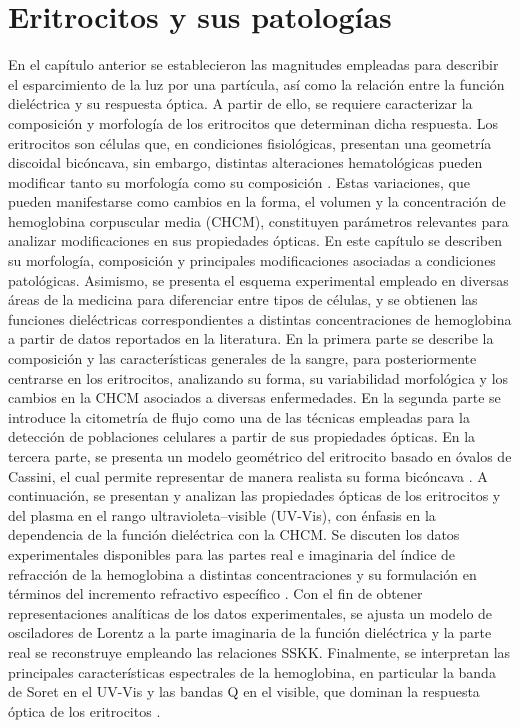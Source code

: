 
\chapter{Eritrocitos y sus patologías}
\label{chapter:eritrocitos}


En el capítulo anterior se establecieron las magnitudes empleadas para describir el esparcimiento de la luz por una partícula, así como la relación entre la función dieléctrica y su respuesta óptica. A partir de ello, se requiere caracterizar la composición y morfología de los eritrocitos que determinan dicha respuesta. Los eritrocitos son células que, en condiciones fisiológicas, presentan una geometría discoidal bicóncava, sin embargo, distintas alteraciones hematológicas pueden modificar tanto su morfología como su composición \cite{palTextbookMedicalPhysiology2021}. Estas variaciones, que pueden manifestarse como cambios en la forma, el volumen y la concentración de hemoglobina corpuscular media (CHCM), constituyen parámetros relevantes para analizar modificaciones en sus propiedades ópticas. En este capítulo se describen su morfología, composición y principales modificaciones asociadas a condiciones patológicas. Asimismo, se presenta el esquema experimental empleado en diversas áreas de la medicina para diferenciar entre tipos de células, y se obtienen las funciones dieléctricas correspondientes a distintas concentraciones de hemoglobina a partir de datos reportados en la literatura. En la primera parte se describe la composición y las características generales de la sangre, para posteriormente centrarse en los eritrocitos, analizando su forma, su variabilidad morfológica y los cambios en la CHCM asociados a diversas enfermedades. En la segunda parte se introduce la citometría de flujo como una de las técnicas empleadas para la detección de poblaciones celulares a partir de sus propiedades ópticas. En la tercera parte, se presenta un modelo geométrico del eritrocito basado en óvalos de Cassini, el cual permite representar de manera realista su forma bicóncava \cite{ereminaDifferentShapeModels2006}. A continuación, se presentan y analizan las propiedades ópticas de los eritrocitos y del plasma en el rango ultravioleta–visible (UV-Vis), con énfasis en la dependencia de la función dieléctrica con la CHCM. Se discuten los datos experimentales disponibles para las partes real e imaginaria del índice de refracción de la hemoglobina a distintas concentraciones y su formulación en términos del incremento refractivo específico \cite{friebelModelFunctionCalculate2006}. Con el fin de obtener representaciones analíticas de los datos experimentales, se ajusta un modelo de osciladores de Lorentz a la parte imaginaria de la función dieléctrica  y la parte real se reconstruye empleando las relaciones SSKK. Finalmente, se interpretan las principales características espectrales de la hemoglobina, en particular la banda de Soret en el UV-Vis y las bandas Q en el visible, que dominan la respuesta óptica de los eritrocitos \cite{dayerBandAssignmentHemoglobin2010}.

